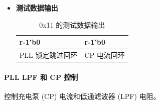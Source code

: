 \documentclass[main\_\_CN.tex]{subfiles}
\begin{document}
\begin{itemize}
\begin{itemize}
\begin{itemize}
                    \item 1100 - 4
                    \item 1101 - 8
                    \item 1110 - 12
                    \item 1111 - 16
                \end{itemize}
        \end{itemize}
    \item \textbf{测试数据输出}
        \begin{longtable}{ |p{6cm}|p{6cm}|}
            \caption{0x11 的测试数据输出}
            \label{tab:test-dout-0x11} \\
            \hline
            \rowcolor{lightgray}
            \textbf{r-1'b0} & \textbf{r-1'b0} \\ \hline
            PLL 锁定跳过回环 & CP 电流回环 \\ \hline
        \end{longtable}
\end{itemize}

\paragraph{PLL LPF 和 CP 控制}
\label{sec:test-code-0x12}
控制充电泵 (CP) 电流和低通滤波器 (LPF) 电阻。
\end{document}
